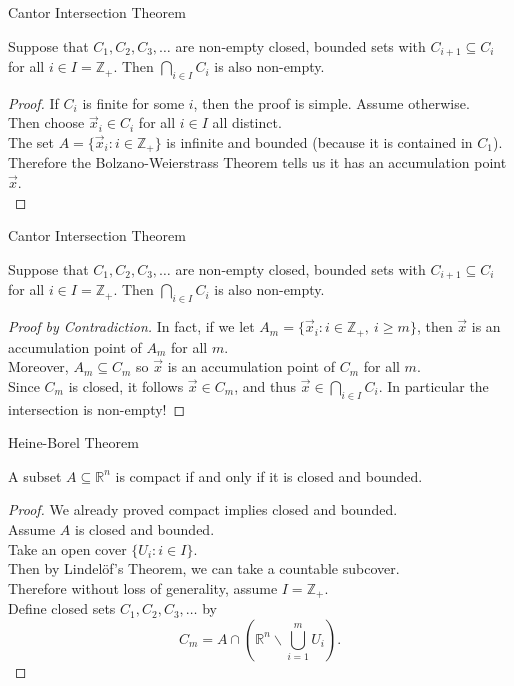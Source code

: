 \documentclass{beamer}
\begin{document}
\begin{frame}{Cantor Intersection Theorem}
\begin{thm}
Suppose that $C_1,C_2,C_3,\dots$ are non-empty closed, bounded sets with $C_{i+1}\subseteq C_i$ for all $i\in I = \mathbb{Z}_+$.
Then $\bigcap_{i\in I} C_i$ is also non-empty.
\end{thm}
\pause
\begin{proof}
\pause
If $C_i$ is finite for some $i$, then the proof is simple. Assume otherwise.\\
\pause
Then choose $\vec x_i\in C_i$ for all $i\in I$ all distinct.\\
\pause
The set $A = \{\vec x_i: i\in \mathbb{Z}_+\}$ is infinite and bounded (because it is contained in $C_1$).\\
\pause
Therefore the Bolzano-Weierstrass Theorem tells us it has an accumulation point $\vec x$.\\
\end{proof}
\end{frame}

\begin{frame}{Cantor Intersection Theorem}
\begin{thm}
Suppose that $C_1,C_2,C_3,\dots$ are non-empty closed, bounded sets with $C_{i+1}\subseteq C_i$ for all $i\in I = \mathbb{Z}_+$.
Then $\bigcap_{i\in I} C_i$ is also non-empty.
\end{thm}
\pause
\begin{proof}[Proof by Contradiction]
\pause
In fact, if we let $A_m = \{\vec x_i: i\in \mathbb{Z}_+,\ i\geq m\}$, then $\vec x$ is an accumulation point of $A_m$ for all $m$.\\
\pause
Moreover, $A_m\subseteq C_m$ so $\vec x$ is an accumulation point of $C_m$ for all $m$.\\
\pause
Since $C_m$ is closed, it follows $\vec x\in C_m$, and thus $\vec x\in \bigcap_{i\in I} C_i$.
\pause
In particular the intersection is non-empty!
\end{proof}
\end{frame}

\begin{frame}{Heine-Borel Theorem}
\begin{thm}
A subset $A\subseteq\mathbb{R}^n$ is compact if and only if it is closed and bounded.
\end{thm}
\pause
\begin{proof}
\pause
We already proved compact implies closed and bounded.\\
\pause
Assume $A$ is closed and bounded.\\
\pause
Take an open cover $\{U_i: i\in I\}$.\\
\pause
Then by Lindel\"{o}f's Theorem, we can take a countable subcover.\\
\pause
Therefore without loss of generality, assume $I=\mathbb{Z}_+$.\\
\pause
Define closed sets $C_1,C_2,C_3,\dots$ by
\pause
$$C_m = A\cap \left(\mathbb{R}^n\backslash \bigcup_{i=1}^m U_i\right).$$
\end{proof}
\end{frame}
\end{document}

